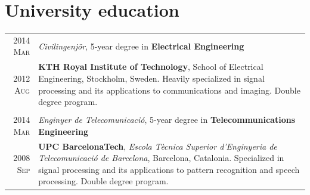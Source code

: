 \documentclass[a4paper,10pt]{article}
\begin{document}

  \section{University education}

    \begin{tabular}{r|p{13cm}}	
    
      \textsc{2014 Mar}  & \emph{Civilingenj\"{o}r}, 5-year degree in \textbf{Electrical Engineering} \\
      \textsc{2012 Aug}  & \footnotesize{\textbf{KTH Royal Institute of Technology}, School of Electrical Engineering, Stockholm, Sweden. 
			   Heavily specialized in signal processing and its applications to communications and imaging. Double degree program.} \\ 
      \multicolumn{2}{c}{} \\

      
      \textsc{2014 Mar}  & \emph{Enginyer de Telecomunicaci\'{o}}, 5-year degree in \textbf{Telecommunications Engineering} \\  
      \textsc{2008 Sep}  & \footnotesize{\textbf{UPC BarcelonaTech}, \emph{Escola T\`{e}cnica Superior
			   d'Enginyeria de Telecomunicaci\'{o} de Barcelona}, Barcelona, Catalonia. 
			   Specialized in signal processing and its applications to pattern recognition and speech processing. Double degree program.} \\
    \end{tabular}

  \begin{bibunit}
    \renewcommand\refname{Publications}
    \nocite{AguilaPla2019,AguilaPla2017,AguilaPla2017a,AguilaPla2018,AguilaPla2018a,AguilaPla2014,Mabtech2017}
    \footnotesize{
    }
  \end{bibunit}
\end{document}
